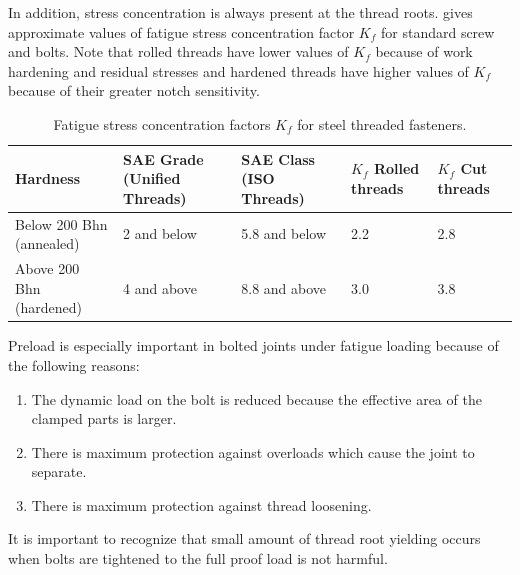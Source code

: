 \documentclass[
10pt,
a4paper,
openany,
svgnames,
]{book}
\begin{document}
In addition, stress concentration is always present at the thread roots.  gives approximate values of fatigue stress concentration factor $K_f$ for standard screw and bolts. Note that rolled threads have lower values of $K_f$ because of work hardening and residual stresses and hardened threads have higher values of $K_f$ because of their greater notch sensitivity.

\begin{table}[h]
  \centering
  \caption{Fatigue stress concentration factors $K_f$ for steel threaded fasteners.}
  \label{table: fatigue stress concentration bolt}
    \begin{tabular}{ L{3cm} C{3cm} C{2.5cm} C{2.5cm} C{2.5cm} }
      \toprule
      Hardness & SAE Grade (Unified Threads) & SAE Class (ISO Threads) & $K_f$ Rolled threads & $K_f$ Cut threads \\
      \midrule
      Below 200 Bhn (annealed) & 2 and below & 5.8 and below & 2.2 & 2.8 \\
      Above 200 Bhn (hardened) & 4 and above & 8.8 and above & 3.0 & 3.8 \\
      \bottomrule
  \end{tabular}
\end{table}

Preload is especially important in bolted joints under fatigue loading because of the following reasons:
\begin{enumerate}
\item The dynamic load on the bolt is reduced because the effective area of the clamped parts is larger.
\item There is maximum protection against overloads which cause the joint to separate.
\item There is maximum protection against thread loosening.
\end{enumerate}

It is important to recognize that small amount of thread root yielding occurs when bolts are tightened to the full proof load is not harmful.
\end{document}
